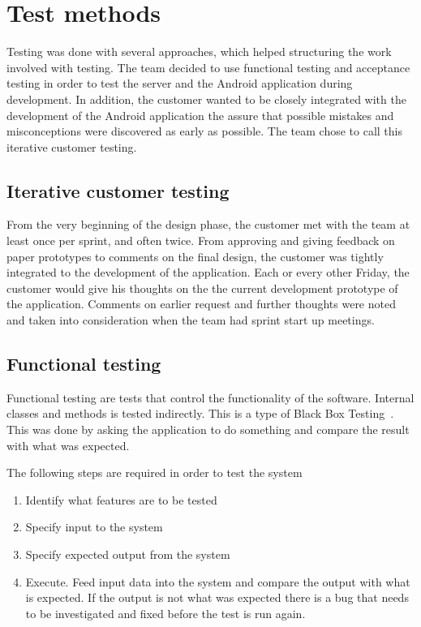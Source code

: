 \section{Test methods}
Testing was done with several approaches, which helped structuring the work involved with testing. The team decided to use functional testing and acceptance testing in order to test the server and the Android application during development. In addition, the customer wanted to be closely integrated with the development of the Android application the assure that possible mistakes and misconceptions were discovered as early as possible. The team chose to call this iterative customer testing.

\subsection{Iterative customer testing}
From the very beginning of the design phase, the customer met with the team at least once per sprint, and often twice. From approving and giving feedback on paper prototypes to comments on the final design, the customer was tightly integrated to the development of the application. Each or every other Friday, the customer would give his thoughts on the the current development prototype of the application. Comments on earlier request and further thoughts were noted and taken into consideration when the team had sprint start up meetings. 

\subsection{Functional testing}
\label{sec:funcTest}
Functional testing are tests that control the functionality of the software. Internal classes and methods is tested indirectly. This is a type of Black Box Testing~\cite{blackbox}.  This was done by asking the application to do something and compare the result with what was expected.

The following steps are required in order to test the system
\begin{enumerate}
\item Identify what features are to be tested
\item Specify input to the system
\item Specify expected output from the system
\item Execute. Feed input data into the system and compare the output with what is expected. If the output is not what was expected there is a bug that needs to be investigated and fixed before the test is run again.
\end{enumerate}

